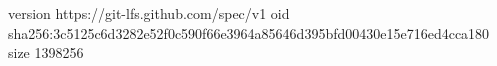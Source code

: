 version https://git-lfs.github.com/spec/v1
oid sha256:3c5125c6d3282e52f0c590f66e3964a85646d395bfd00430e15e716ed4cca180
size 1398256
